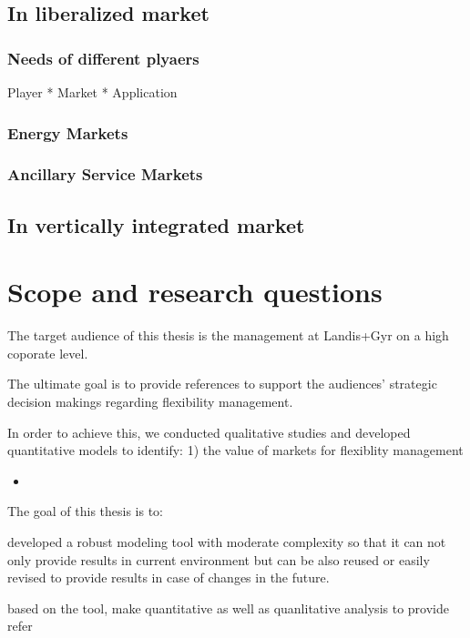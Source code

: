 \documentclass[a4paper,11pt,twoside,onecolumn]{book}
\begin{document}
\subsection{In liberalized market}

\subsubsection{Needs of different plyaers}

Player * Market * Application


\subsubsection{Energy Markets}


\subsubsection{Ancillary Service Markets}

\subsection{In vertically integrated market}


\section{Scope and research questions}

The target audience of this thesis is the management at Landis+Gyr on a high coporate level.

The ultimate goal is to provide references to support the audiences' strategic decision makings regarding flexibility management.

In order to achieve this, we conducted qualitative studies and developed quantitative models to identify: 1) the value of markets for flexiblity management

\begin{itemize}
	\item 
\end{itemize}

The goal of this thesis is to:

developed a robust modeling tool with moderate complexity so that it can not only provide results in current environment but can be also reused or easily revised to provide results in case of changes in the future.

based on the tool, make quantitative as well as quanlitative analysis to provide refer 
\end{document}
